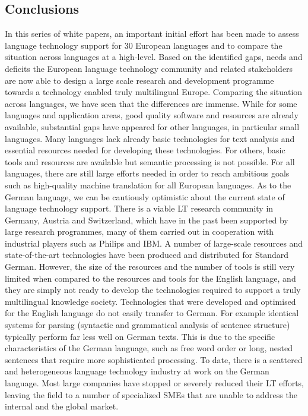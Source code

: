 \documentclass[]{../metanetpaper}
\begin{document}
	\subsection{Conclusions}
In this series of white papers, an important initial effort has been made to assess language technology support for 30 European languages and to compare the situation across languages at a high-level. Based on the identified gaps, needs and deficits the European language technology community and related stakeholders are now able to design a large scale research and development programme towards a technology enabled truly multilingual Europe.
Comparing the situation across languages, we have seen that the differences are immense. While for some languages and application areas, good quality software and resources are already available, substantial gaps have appeared for other languages, in particular small languages. Many languages lack already basic technologies for text analysis and essential resources needed for developing these technologies. For others, basic tools and resources are available but semantic processing is not possible. For all languages, there are still large efforts needed in order to reach ambitious goals such as high-quality machine translation for all European languages.  
As to the German language, we can be cautiously optimistic about the current state of language technology support. There is a viable LT research community in Germany, Austria and Switzerland, which have in the past been supported by large research programmes, many of them carried out in cooperation with industrial players such as Philips and IBM. A number of large-scale resources and state-of-the-art technologies have been produced and distributed for Standard German. However, the size of the resources and the number of tools is still very limited when compared to the resources and tools for the English language, and they are simply not ready to develop the technologies required to support a truly multilingual knowledge society.
Technologies that were developed and optimised for the English language do not easily transfer to German. For example identical systems for parsing (syntactic and grammatical analysis of sentence structure) typically perform far less well on German texts. This is due to the specific characteristics of the German language, such as free word order or long, nested sentences that require more sophisticated processing.
To date, there is a scattered and heterogeneous language technology industry at work on the German language. Most large companies have stopped or severely reduced their LT efforts, leaving the field to a number of specialized SMEs that are unable to address the internal and the global market. 
\end{document}
